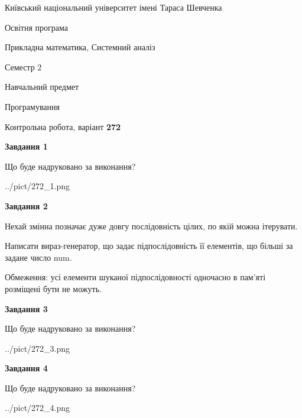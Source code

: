 \documentclass[12pt, ukrainian]{article}
\begin{document}
{{\begin {small}\par
{ \center  Київський національний університет імені Тараса Шевченка \par}
{\parbox {5 cm}{Освітня програма \hfill}{\parbox {8 cm}{Прикладна математика, Системний аналіз \hfill}}\parbox {5 cm}{\hfill Семестр 2}}\par
{\parbox {5 cm} {Навчальний предмет \hfill}\parbox {7 cm}{Програмування \hfill}\parbox {6cm}{\hfill}\par}\vspace{-7pt} \end{small}}{\center Контрольна робота, варіант  \No \textbf
{ 272 }\par}}
{
\begin {large}
{\begin {center}\textbf{Завдання 1}\end {center}}\par
Що буде надруковано за виконання?\par\par
\begin{center}
	{../pict/272_1.png}
\end{center}
\newpage

{\begin {center}\textbf{Завдання 2}\end {center}}\par
Нехай змінна  позначає дуже довгу послідовність цілих, по якій можна ітерувати.

Написати вираз-генератор, що задає підпослідовність її елементів, що більші за задане число num.

Обмеження: усі елементи шуканої підпослідовності одночасно в пам'яті розміщені бути не можуть.\par
\newpage

{\begin {center}\textbf{Завдання 3}\end {center}}\par
Що буде надруковано за виконання?\par
\begin{center}
	{../pict/272_3.png}
\end{center}
\newpage

{\begin {center}\textbf{Завдання 4}\end {center}}\par
Що буде надруковано за виконання?\par
\begin{center}
	{../pict/272_4.png}
\end{center}
\newpage


\end{large}}
\end{document}
